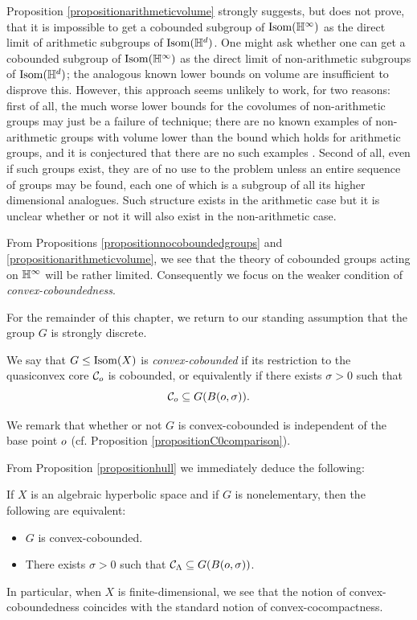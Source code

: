 \begin{remark}
Proposition \ref{propositionarithmeticvolume} strongly suggests, but does not prove, that it is impossible to get a cobounded subgroup of $\Isom(\H^\infty)$ as the direct limit of arithmetic subgroups of $\Isom(\H^d)$. One might ask whether one can get a cobounded subgroup of $\Isom(\H^\infty)$ as the direct limit of non-arithmetic subgroups of $\Isom(\H^d)$; the analogous known lower bounds on volume \cite{AdeboyeWei,Kellerhalls} are insufficient to disprove this. However, this approach seems unlikely to work, for two reasons: first of all, the much worse lower bounds for the covolumes of non-arithmetic groups may just be a failure of technique; there are no known examples of non-arithmetic groups with volume lower than the bound which holds for arithmetic groups, and it is conjectured that there are no such examples \cite[p.9]{Belolipetsky_survey}. %
Second of all, even if such groups exist, they are of no use to the problem unless an entire sequence of groups may be found, each one of which is a subgroup of all its higher dimensional analogues. Such structure exists in the arithmetic case but it is unclear whether or not it will also exist in the non-arithmetic case.
\end{remark}

From Propositions \ref{propositionnocoboundedgroups} and \ref{propositionarithmeticvolume}, we see that the theory of cobounded groups acting on $\H^\infty$ will be rather limited. Consequently we focus on the weaker condition of \emph{convex-coboundedness}.

For the remainder of this chapter, we return to our standing assumption that the group $G$ is strongly discrete.

\begin{definition}
\label{definitionCCB}
We say that $G\leq\operatorname{Isom}(X)$ is \emph{convex-cobounded} if its restriction to the quasiconvex core $\mathcal C_o$ is cobounded, or equivalently if there exists $\sigma > 0$ such that
\[
\mathcal C_o\subseteq G(B(o,\sigma)).
\]
\end{definition}
We remark that whether or not $G$ is convex-cobounded is independent of the base point $o$ (cf. Proposition \ref{propositionC0comparison}).

From Proposition \ref{propositionhull} we immediately deduce the following:
\begin{observation}
\label{observationCCBwCCB}
If $X$ is an algebraic hyperbolic space and if $G$ is nonelementary, then the following are equivalent:
\begin{itemize}
\item[(A)] $G$ is convex-cobounded.
\item[(B)] There exists $\sigma > 0$ such that $\mathcal C_\Lambda\subseteq G(B(o,\sigma))$.
\end{itemize}
In particular, when $X$ is finite-dimensional, we see that the notion of convex-coboundedness coincides with the standard notion of convex-cocompactness.
\end{observation}

